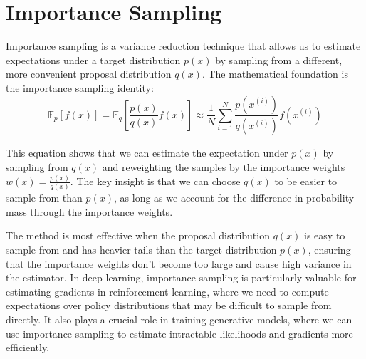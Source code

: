 
\section{Importance Sampling }
\label{sec:importance-sampling}

Importance sampling is a variance reduction technique that allows us to estimate expectations under a target distribution $p(x)$ by sampling from a different, more convenient proposal distribution $q(x)$. The mathematical foundation is the importance sampling identity:
\begin{equation}
\mathbb{E}_{p}[f(x)] = \mathbb{E}_{q}\left[\frac{p(x)}{q(x)} f(x)\right] \approx \frac{1}{N} \sum_{i=1}^{N} \frac{p(x^{(i)})}{q(x^{(i)})} f(x^{(i)})
\end{equation}

This equation shows that we can estimate the expectation under $p(x)$ by sampling from $q(x)$ and reweighting the samples by the importance weights $w(x) = \frac{p(x)}{q(x)}$. The key insight is that we can choose $q(x)$ to be easier to sample from than $p(x)$, as long as we account for the difference in probability mass through the importance weights.

The method is most effective when the proposal distribution $q(x)$ is easy to sample from and has heavier tails than the target distribution $p(x)$, ensuring that the importance weights don't become too large and cause high variance in the estimator. In deep learning, importance sampling is particularly valuable for estimating gradients in reinforcement learning, where we need to compute expectations over policy distributions that may be difficult to sample from directly. It also plays a crucial role in training generative models, where we can use importance sampling to estimate intractable likelihoods and gradients more efficiently.






